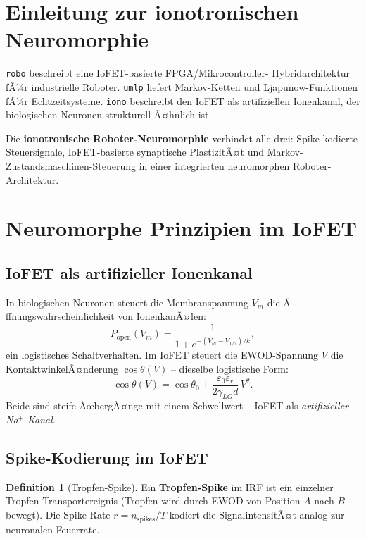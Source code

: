 ﻿\documentclass[a4paper,12pt]{scrreprt}
\theoremstyle{definition}
\newtheorem{definition}{Definition}[section]
\begin{document}
\section{Einleitung zur ionotronischen Neuromorphie}

\texttt{robo} beschreibt eine IoFET-basierte FPGA/Mikrocontroller-
Hybridarchitektur fÃ¼r industrielle Roboter. \texttt{umlp} liefert
Markov-Ketten und Ljapunow-Funktionen fÃ¼r Echtzeitsysteme.
\texttt{iono} beschreibt den IoFET als artifiziellen Ionenkanal, der
biologischen Neuronen strukturell Ã¤hnlich ist.

Die \textbf{ionotronische Roboter-Neuromorphie} verbindet alle drei:
Spike-kodierte Steuersignale, IoFET-basierte synaptische PlastizitÃ¤t
und Markov-Zustandsmaschinen-Steuerung in einer integrierten
neuromorphen Roboter-Architektur.

\section{Neuromorphe Prinzipien im IoFET}

\subsection{IoFET als artifizieller Ionenkanal}

In biologischen Neuronen steuert die Membranspannung $V_m$ die
Ã–ffnungswahrscheinlichkeit von IonenkanÃ¤len:
\[
  P_{\mathrm{open}}(V_m) = \frac{1}{1 + e^{-(V_m - V_{1/2})/k}},
\]
ein logistisches Schaltverhalten. Im IoFET steuert die EWOD-Spannung
$V$ die KontaktwinkelÃ¤nderung $\cos\theta(V)$ -- dieselbe logistische
Form:
\[
  \cos\theta(V) = \cos\theta_0 + \frac{\varepsilon_0\varepsilon_r}{2\gamma_{LG}d}\,V^2.
\]
Beide sind steife ÃœbergÃ¤nge mit einem Schwellwert -- IoFET als
\emph{artifizieller Na$^+$-Kanal}.

\subsection{Spike-Kodierung im IoFET}

\begin{definition}[Tropfen-Spike]
  Ein \textbf{Tropfen-Spike} im IRF ist ein einzelner Tropfen-Transportereignis
  (Tropfen wird durch EWOD von Position $A$ nach $B$ bewegt). Die
  Spike-Rate $r = n_{\mathrm{spikes}}/T$ kodiert die SignalintensitÃ¤t
  analog zur neuronalen Feuerrate.
\end{definition}
\end{document}
